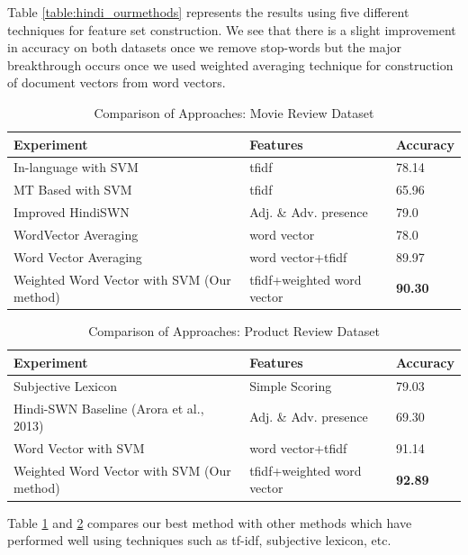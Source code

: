 \documentclass[11pt,a4paper]{article}
\begin{document}
Table \ref{table:hindi_ourmethods} represents the results using five different techniques for feature set construction. We see that there is a slight improvement in accuracy on both datasets once we remove stop-words but the major breakthrough occurs once we used weighted averaging technique for construction of document vectors from word vectors.

\begin {table}[H]
\centering
\small
\begin{tabular}{ | p{3.3cm} | p{2.2cm} | p{1.15cm} | }
\hline
\textbf{Experiment} & \textbf{Features} & \textbf{Accuracy} \\ \hline
In-language with SVM \cite{Joshi:10} & tfidf & 78.14\\ \hline
MT Based with SVM \cite{Joshi:10} & tfidf & 65.96\\ \hline
Improved HindiSWN \cite{Bakliwal:12} & Adj. \& Adv. presence & 79.0\\ \hline
WordVector Averaging & word vector & 78.0\\ \hline
Word Vector Averaging & word vector+tfidf & 89.97\\ \hline
Weighted Word Vector with SVM (Our method) & tfidf+weighted word vector & \textbf{90.30}\\ \hline
\end{tabular}
\caption {Comparison of Approaches: Movie Review Dataset}
\label{table:hindi_movie}
\end{table}

\begin {table}[H]
\centering
\small
\begin{tabular}{ | p{3.3cm} | p{2.2cm} | p{1.15cm} | }
\hline
\textbf{Experiment} & \textbf{Features} & \textbf{Accuracy} \\ \hline
Subjective Lexicon~\cite{Bakliwal:12} & Simple Scoring & 79.03\\ \hline
Hindi-SWN Baseline (Arora et al., 2013) & Adj. \& Adv. presence & 69.30\\ \hline
Word Vector with SVM & word vector+tfidf & 91.14\\ \hline
Weighted Word Vector with SVM (Our method) & tfidf+weighted word vector & \textbf{92.89}\\ \hline
\end{tabular}
\caption {Comparison of Approaches: Product Review Dataset}
\label{table:hindi_product}
\end{table}
Table \ref{table:hindi_movie} and \ref{table:hindi_product} compares our best method with other methods which have performed well using techniques such as tf-idf, subjective lexicon, etc.
\end{document}
